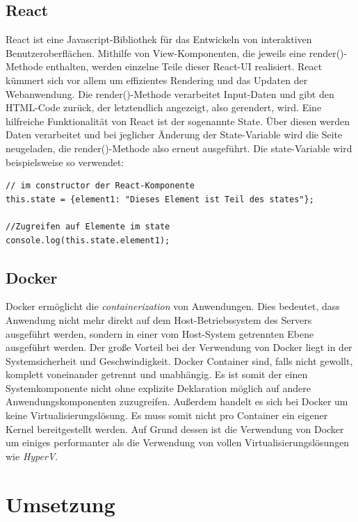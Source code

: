\documentclass[12pt,a4paper]{report}
\begin{document}
\section{React}
React ist eine Javascript-Bibliothek für das Entwickeln von interaktiven Benutzeroberflächen. Mithilfe von View-Komponenten, die jeweils eine render()-Methode enthalten, werden einzelne Teile dieser React-UI realisiert. React kümmert sich vor allem um effizientes Rendering und das Updaten der Webanwendung.
Die render()-Methode verarbeitet Input-Daten und gibt den HTML-Code zurück, der letztendlich angezeigt, also gerendert, wird.
Eine hilfreiche Funktionalität von React ist der sogenannte State. Über diesen werden Daten verarbeitet und bei jeglicher Änderung der State-Variable wird die Seite neugeladen, die render()-Methode also erneut ausgeführt.
Die state-Variable wird beispielsweise so verwendet:

\begin{verbatim}
// im constructor der React-Komponente
this.state = {element1: "Dieses Element ist Teil des states"};

//Zugreifen auf Elemente im state
console.log(this.state.element1);
\end{verbatim}


\section{Docker}

Docker ermöglicht die \textit{containerization} von Anwendungen. Dies bedeutet, dass Anwendung nicht mehr direkt auf dem Host-Betriebssystem des Servers ausgeführt werden, sondern in einer vom Host-System getrennten Ebene ausgeführt werden. Der große Vorteil bei der Verwendung von Docker liegt in der Systemsicherheit und Geschwindigkeit. Docker Container sind, falls nicht gewollt, komplett voneinander getrennt und unabhängig. Es ist somit der einen Systemkomponente nicht ohne explizite Deklaration möglich auf andere Anwendungskomponenten zuzugreifen. Außerdem handelt es sich bei Docker um keine Virtualisierungslösung. Es muss somit nicht pro Container ein eigener Kernel bereitgestellt werden. Auf Grund dessen ist die Verwendung von Docker um einiges performanter als die Verwendung von vollen Virtualisierungslösungen wie \textit{HyperV}.

\newpage
\chapter{Umsetzung}
\end{document}
